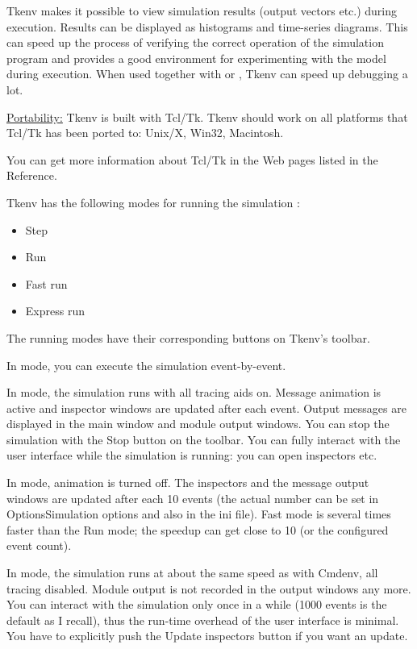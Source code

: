 Tkenv makes it possible to view simulation results (output vectors
etc.) during execution. Results can be displayed as histograms and
time-series diagrams. This can speed up the process of verifying the
correct operation of the simulation program and provides a good
environment for experimenting with the model during execution.  When
used together with  or , Tkenv can speed up
debugging a lot.


{\underline {Portability:}} Tkenv is built with Tcl/Tk. Tkenv should 
work on all platforms that Tcl/Tk has been ported to: Unix/X, 
Win32, Macintosh.


You can get more information about Tcl/Tk in the Web pages listed 
in the Reference.




Tkenv has the following modes for running the simulation :
\begin{itemize}
\item{Step}
\item{Run}
\item{Fast run}
\item{Express run}
\end{itemize}


The running modes have their corresponding buttons on Tkenv's 
toolbar.


In  mode, you can execute the simulation event-by-event.


In  mode, the simulation runs with all tracing aids on. 
Message animation is active and inspector windows are updated 
after each event. Output messages are displayed in the main window 
and module output windows. You can stop the simulation with the 
Stop button on the toolbar. You can fully interact with the user 
interface while the simulation is running: you can open inspectors 
etc.


In  mode, animation is turned off. The inspectors and 
the message output windows are updated after each 10 events (the 
actual number can be set in Options{\textbar}Simulation options and 
also in the ini file). Fast mode is several times faster than 
the Run mode; the speedup can get close to 10 (or the configured 
event count).

In  mode, the simulation runs at about the same speed 
as with Cmdenv, all tracing disabled. Module output is not recorded 
in the output windows any more. You can interact with the simulation 
only once in a while (1000 events is the default as I recall), 
thus the run-time overhead of the user interface is minimal. 
You have to explicitly push the Update inspectors button if you 
want an update.


